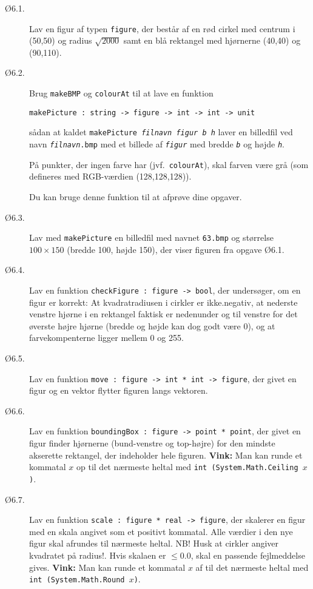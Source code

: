 \documentclass[a4paper]{article}
\begin{document}
\begin{description}

\item[Ø6.1.] Lav en figur af typen \texttt{figure}, der består af en
  rød cirkel med centrum i (50,50) og radius $\sqrt{2000}$ samt en blå
  rektangel med hjørnerne (40,40) og (90,110).

\item[Ø6.2.] Brug \texttt{makeBMP} og \texttt{colourAt} til at lave en
  funktion

\texttt{makePicture : string -> figure -> int -> int -> unit}

\noindent
sådan at kaldet \texttt{makePicture \emph{filnavn figur b h}} laver en
billedfil ved navn \texttt{\emph{filnavn}.bmp} med et billede af
\texttt{\emph{figur}} med bredde \texttt{\emph{b}} og højde
\texttt{\emph{h}}.

På punkter, der ingen farve har (jvf.\ \texttt{colourAt}), skal farven
være grå (som defineres med RGB-værdien (128,128,128)).

Du kan bruge denne funktion til at afprøve dine opgaver.

\item[Ø6.3.] Lav med \texttt{makePicture} en billedfil med navnet
  \texttt{63.bmp} og størrelse $100\times150$ (bredde 100, højde 150),
  der viser figuren fra opgave Ø6.1.

\item[Ø6.4.] Lav en funktion \texttt{checkFigure : figure -> bool},
  der undersøger, om en figur er korrekt: At kvadratradiusen i cirkler
  er ikke.negativ, at nederste venstre hjørne i en rektangel faktisk
  er nedenunder og til venstre for det øverste højre hjørne (bredde og
  højde kan dog godt være 0), og at farvekompenterne ligger mellem 0
  og 255.

\item[Ø6.5.] Lav en funktion \texttt{move : figure -> int * int ->
  figure}, der givet en figur og en vektor flytter figuren langs
  vektoren.

\item[Ø6.6.] Lav en funktion \texttt{boundingBox : figure -> point *
  point}, der givet en figur finder hjørnerne (bund-venstre og
  top-højre) for den mindste akserette rektangel, der indeholder hele
  figuren.  \textbf{Vink:} Man kan runde et kommatal $x$ op til det
  nærmeste heltal med \texttt{int (System.Math.Ceiling $x$)}.

\item[Ø6.7.] Lav en funktion \texttt{scale : figure * real -> figure},
  der skalerer en figur med en skala angivet som et positivt kommatal.
  Alle værdier i den nye figur skal afrundes til nærmeste heltal.  NB!
  Husk at cirkler angiver kvadratet på radius!.  Hvis skalaen er $\leq
  0.0$, skal en passende fejlmeddelse gives.  \textbf{Vink:} Man kan
  runde et kommatal $x$ af til det nærmeste heltal med \texttt{int
    (System.Math.Round $x$)}.


\end{description}
\end{document}
